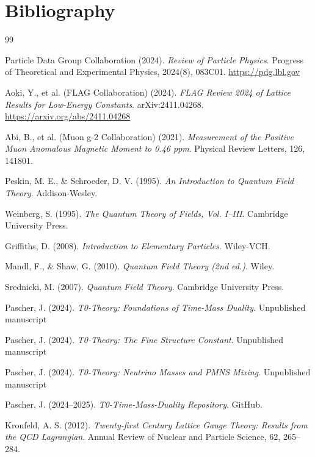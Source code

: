 	\section{Bibliography}
	
	\begin{thebibliography}{99}
		
		Particle Data Group Collaboration (2024). 
		\textit{Review of Particle Physics}. 
		Progress of Theoretical and Experimental Physics, 2024(8), 083C01.
		\url{https://pdg.lbl.gov}
		
		Aoki, Y., et al. (FLAG Collaboration) (2024). 
		\textit{FLAG Review 2024 of Lattice Results for Low-Energy Constants}. 
		arXiv:2411.04268.
		\url{https://arxiv.org/abs/2411.04268}
		
		Abi, B., et al. (Muon g-2 Collaboration) (2021). 
		\textit{Measurement of the Positive Muon Anomalous Magnetic Moment to 0.46 ppm}. 
		Physical Review Letters, 126, 141801.
		
		Peskin, M. E., \& Schroeder, D. V. (1995). 
		\textit{An Introduction to Quantum Field Theory}. 
		Addison-Wesley.
		
		Weinberg, S. (1995). 
		\textit{The Quantum Theory of Fields, Vol. I--III}. 
		Cambridge University Press.
		
		Griffiths, D. (2008). 
		\textit{Introduction to Elementary Particles}. 
		Wiley-VCH.
		
		Mandl, F., \& Shaw, G. (2010). 
		\textit{Quantum Field Theory (2nd ed.)}. 
		Wiley.
		
		Srednicki, M. (2007). 
		\textit{Quantum Field Theory}. 
		Cambridge University Press.
		
		Pascher, J. (2024). 
		\textit{T0-Theory: Foundations of Time-Mass Duality}. 
		Unpublished manuscript
		
		Pascher, J. (2024). 
		\textit{T0-Theory: The Fine Structure Constant}. 
		Unpublished manuscript
		
		Pascher, J. (2024). 
		\textit{T0-Theory: Neutrino Masses and PMNS Mixing}. 
		Unpublished manuscript
		
		Pascher, J. (2024--2025). 
		\textit{T0-Time-Mass-Duality Repository}. 
		GitHub.

		Kronfeld, A. S. (2012). 
		\textit{Twenty-first Century Lattice Gauge Theory: Results from the QCD Lagrangian}. 
		Annual Review of Nuclear and Particle Science, 62, 265--284.
		

\end{thebibliography}
